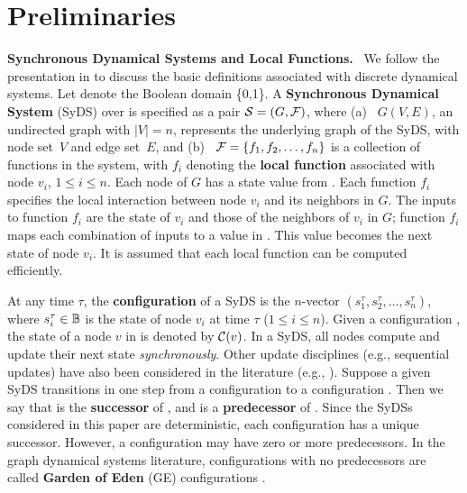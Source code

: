 \section{Preliminaries}
\label{sec:prelim}

\textbf{Synchronous Dynamical Systems and Local Functions.}~
We follow the presentation in \cite{BH+07} to discuss
the basic definitions associated with discrete dynamical systems.
Let \bbb{} denote the Boolean domain \{0,1\}.
A \textbf{Synchronous Dynamical System} (SyDS)
\cals{} over \bbb{} is specified as
a pair ${\cal S}  = (G, {\cal F})$, where 
(a)~ $G(V,E)$, an undirected graph with $|V| = n$, 
represents the underlying graph of the SyDS,
with node set~$V$ and edge set~$E$, and 
(b)~ ${\cal F} = \{f_1, f_2, \ldots, f_n \}$ is a collection of
functions in the system, with
$f_i$ denoting the \textbf{local function} 
associated with node $v_i$, $1 \leq i \leq n$.
Each node of $G$ has a state value from \bbb. 
Each function $f_i$ specifies the local interaction
between node $v_i$ and its neighbors in $G$.
The inputs to function $f_i$ are the state of $v_i$ and
those of the neighbors of $v_i$ in $G$; function $f_i$ maps 
each combination of inputs to a value in \bbb.
This value becomes the next state of node $v_i$. 
It is assumed that each local function can be computed efficiently.

At any time $\tau$, 
the {\bf configuration} \calc{} of a SyDS 
is the $n$-vector $(s_1^{\tau}, s_2^{\tau}, \ldots, s_n^{\tau})$,
where $s_i^{\tau} \in \mbox{$\mathbb{B}$}$ is the state of
node $v_i$ at time $\tau$ ($1 \leq i \leq n$).
Given a configuration \calc, the state of a node $v$ in \calc{}
is denoted by $\mbox{$\mathcal{C}$}(v)$.
In a SyDS, all nodes compute and update their next state  
\emph{synchronously}.
Other update disciplines (e.g., sequential updates) 
have also been considered in the literature (e.g., \cite{BH+07}).
Suppose a given SyDS transitions in one step from
a configuration \calcp{} to a configuration \calc.
Then we say that \calc{} is the \textbf{successor} of \calcp,
and \calcp{} is a \textbf{predecessor} of \calc.
Since the SyDSs considered in this paper are deterministic,
each configuration has a unique successor.
However, a configuration may have zero
or more predecessors.
In the graph dynamical systems literature, configurations with 
no predecessors are called \textbf{Garden of Eden}
(GE) configurations \cite{MR-2007}.


